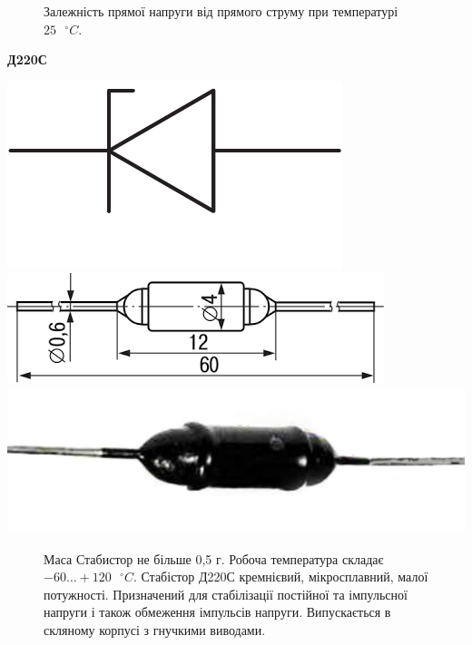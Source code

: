 \documentclass[a4paper,14pt]{extreport}
\begin{document}
\begin{figure}[h!]
\begin{minipage}[h]{0.55\linewidth}
    \caption{Залежність прямої напруги від прямого струму при температурі $25\text{ }^{\circ}C$.}
  \end{minipage}
\end{figure}

\clearpage
\begin{tcolorbox}[colback=white!100,colframe=red!75!black,width=19cm,righttitle=0.5cm,subtitle style={boxrule=0.4pt, colback=yellow!50!red!25!white},title= \bf{Графічне позначення}\hfill  \bf{Натуральне зоображення}]
  \begin{center}\bf{Д220С}\end{center}
  \tcblower
  \includegraphics[scale=0.5]{1.3.23.pdf}\hfill \includegraphics[scale=0.4]{1.3.28.png} \hfill\includegraphics[scale=0.35]{1.3.27.pdf}
\end{tcolorbox}
\begin{figure}
\vspace{-0.7 cm}
\parbox{11cm}{%
  \begin{tcolorbox}[width=12cm,right=0.5cm]
  Маса Стабистор не більше 0,5 г. Робоча температура складає $-60\ldots+120 \text{ }^{ \circ}C$.
  Стабістор Д220С кремнієвий, мікросплавний, малої потужності.
Призначений для стабілізації постійної та імпульсної напруги і також обмеження імпульсів напруги. Випускається в скляному корпусі з гнучкими виводами.
  \end{tcolorbox}}
\end{figure}
\end{document}
